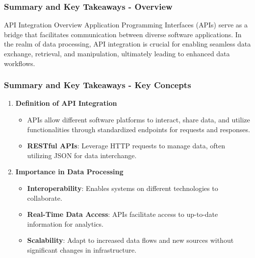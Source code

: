 \documentclass[aspectratio=169]{beamer}
\begin{document}
\begin{frame}[fragile]
    \frametitle{Summary and Key Takeaways - Overview}
    \begin{block}{API Integration Overview}
        Application Programming Interfaces (APIs) serve as a bridge that facilitates communication between diverse software applications. In the realm of data processing, API integration is crucial for enabling seamless data exchange, retrieval, and manipulation, ultimately leading to enhanced data workflows.
    \end{block}
\end{frame}

\begin{frame}[fragile]
    \frametitle{Summary and Key Takeaways - Key Concepts}
    \begin{enumerate}
        \item \textbf{Definition of API Integration}
            \begin{itemize}
                \item APIs allow different software platforms to interact, share data, and utilize functionalities through standardized endpoints for requests and responses.
                \item \textbf{RESTful APIs}: Leverage HTTP requests to manage data, often utilizing JSON for data interchange.
            \end{itemize}
        \item \textbf{Importance in Data Processing}
            \begin{itemize}
                \item \textbf{Interoperability}: Enables systems on different technologies to collaborate.
                \item \textbf{Real-Time Data Access}: APIs facilitate access to up-to-date information for analytics.
                \item \textbf{Scalability}: Adapt to increased data flows and new sources without significant changes in infrastructure.
            \end{itemize}
    \end{enumerate}
\end{frame}
\end{document}

